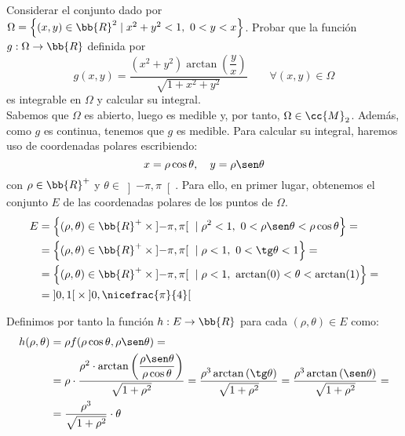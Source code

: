 \begin{ejercicio}
    Considerar el conjunto dado por $\Omega=\left\{\left(x,y\right)\in \bb{R}^2 \mid x^2 + y^2 < 1,~0<y<x\right\}$.
    Probar que la función
    $g:\Omega\to \bb{R}$ definida por
    \begin{equation*}
        g(x,y) = \dfrac{(x^2+y^2)\arctan\left(\dfrac{y}{x}\right)}{\sqrt{1+x^2+y^2}}\qquad \forall (x,y)\in \Omega
    \end{equation*}
    es integrable en $\Omega$ y calcular su integral.\\

    Sabemos que $\Omega$ es abierto, luego es medible y, por tanto, $\Omega\in \cc{M}_2$. Además, como $g$ es continua, tenemos que $g$ es medible.
    Para calcular su integral, haremos uso de coordenadas polares escribiendo:
    \begin{equation*}
        x = \rho\cos\theta, \quad y = \rho\sen\theta
    \end{equation*}
    con $\rho\in \bb{R}^+$ y $\theta\in \left]-\pi, \pi\right[$. Para ello, en primer lugar, obtenemos el conjunto $E$ de las coordenadas polares de los puntos de $\Omega$.
    \begin{align*}
        E &= \left\{ (\rho, \theta) \in \bb{R}^+\times \left]-\pi, \pi\right[ ~\mid \rho^2 < 1,~0<\rho\sen\theta<\rho\cos\theta \right\} =\\
        &= \left\{ (\rho, \theta) \in \bb{R}^+\times \left]-\pi, \pi\right[ ~\mid \rho < 1,~0<\tg\theta<1 \right\} =\\
        &= \left\{ (\rho, \theta) \in \bb{R}^+\times \left]-\pi, \pi\right[ ~\mid \rho < 1,~\arctan(0)<\theta<\arctan(1)\right\} =\\
        &= \left]0, 1\right[\times \left]0, \nicefrac{\pi}{4}\right[
    \end{align*}

    Definimos por tanto la función $h: E \to \bb{R}$ para cada $(\rho, \theta) \in E$ como:
    \begin{align*}
        h(\rho, \theta) &= \rho f(\rho\cos\theta, \rho\sen\theta)=\\
        &= \rho\cdot \dfrac{\rho^2 \cdot \arctan\left(\dfrac{\rho\sen\theta}{\rho\cos\theta}\right)}{\sqrt{1+\rho^2}}
        = \dfrac{\rho^3\arctan\left(\tg\theta\right)}{\sqrt{1+\rho^2}} = \dfrac{\rho^3\arctan\left(\sen\theta\right)}{\sqrt{1+\rho^2}} =\\
        &= \dfrac{\rho^3}{\sqrt{1+\rho^2}}\cdot \theta
    \end{align*}


\end{ejercicio}
